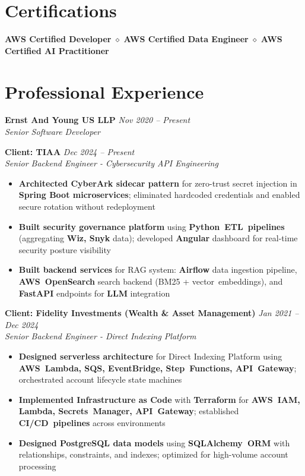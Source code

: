 \documentclass[11pt,a4paper]{article}
\newcommand{\resumeItem}[1]{\item\small{#1}}
\newcommand{\resumeItemList}[1]{\begin{itemize}[leftmargin=0.5in, itemsep=0.25em, parsep=0pt, partopsep=0pt, topsep=0.25em]
    \small
    #1
\end{itemize}}
\begin{document}
\section{Certifications}
\begin{center}
    \small\textbf{AWS Certified Developer} \hspace{0.3em} $\diamond$ \hspace{0.3em} \textbf{AWS Certified Data Engineer} \hspace{0.3em} $\diamond$ \hspace{0.3em} \textbf{AWS Certified AI Practitioner}
\end{center}

\section{Professional Experience}

\textbf{Ernst And Young US LLP} \hfill \textit{Nov 2020 -- Present}\\
\textit{Senior Software Developer}

\textbf{Client: TIAA} \hfill \textit{Dec 2024 -- Present}\\
\textit{Senior Backend Engineer - Cybersecurity API Engineering}
\resumeItemList{
    \resumeItem{\textbf{Architected CyberArk sidecar pattern} for zero-trust secret injection in \textbf{Spring Boot microservices}; eliminated hardcoded credentials and enabled secure rotation without redeployment}
    \resumeItem{\textbf{Built security governance platform} using \textbf{Python~ETL~pipelines} (aggregating \textbf{Wiz, Snyk} data); developed \textbf{Angular} dashboard for real-time security posture visibility}
    \resumeItem{\textbf{Built backend services} for RAG system: \textbf{Airflow} data ingestion pipeline, \textbf{AWS~OpenSearch} search backend (BM25 + vector~embeddings), and \textbf{FastAPI} endpoints for \textbf{LLM} integration}
}
\vspace{0.4em}

\textbf{Client: Fidelity Investments (Wealth \& Asset Management)} \hfill \textit{Jan 2021 -- Dec 2024}\\
\textit{Senior Backend Engineer - Direct Indexing Platform}
\resumeItemList{
    \resumeItem{\textbf{Designed serverless architecture} for Direct Indexing Platform using \textbf{AWS~Lambda, SQS, EventBridge, Step~Functions, API~Gateway}; orchestrated account lifecycle state machines}
    \resumeItem{\textbf{Implemented Infrastructure as Code} with \textbf{Terraform} for \textbf{AWS~IAM, Lambda, Secrets~Manager, API~Gateway}; established \textbf{CI/CD~pipelines} across environments}
    \resumeItem{\textbf{Designed PostgreSQL data models} using \textbf{SQLAlchemy~ORM} with relationships, constraints, and indexes; optimized for high-volume account processing}
}
\vspace{0.4em}
\end{document}
